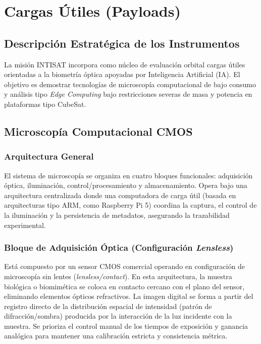 \chapter{Cargas Útiles (Payloads)}

\section{Descripción Estratégica de los Instrumentos}
La misión INTISAT incorpora como núcleo de evaluación orbital cargas útiles orientadas a la biometría óptica apoyadas por Inteligencia Artificial (IA). El objetivo es demostrar tecnologías de microscopía computacional de bajo consumo y análisis tipo \textit{Edge Computing} bajo restricciones severas de masa y potencia en plataformas tipo CubeSat.

\section{Microscopía Computacional CMOS}

\subsection{Arquitectura General}
El sistema de microscopía se organiza en cuatro bloques funcionales: adquisición óptica, iluminación, control/procesamiento y almacenamiento.
Opera bajo una arquitectura centralizada donde una computadora de carga útil (basada en arquitecturas tipo ARM, como Raspberry Pi 5) coordina la captura, el control de la iluminación y la persistencia de metadatos, asegurando la trazabilidad experimental.

\subsection{Bloque de Adquisición Óptica (Configuración \textit{Lensless})}
Está compuesto por un sensor CMOS comercial operando en configuración de microscopía sin lentes (\textit{lensless/contact}). En esta arquitectura, la muestra biológica o biomimética se coloca en contacto cercano con el plano del sensor, eliminando elementos ópticos refractivos. La imagen digital se forma a partir del registro directo de la distribución espacial de intensidad (patrón de difracción/sombra) producida por la interacción de la luz incidente con la muestra. Se prioriza el control manual de los tiempos de exposición y ganancia analógica para mantener una calibración estricta y consistencia métrica.

